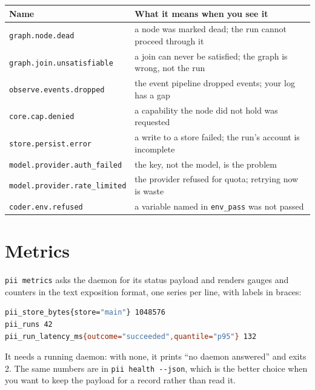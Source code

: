 \begin{center}\footnotesize
\begin{tabular}{@{}>{\raggedright\arraybackslash}p{}>{\raggedright\arraybackslash}p{}@{}}
  \toprule
  \textbf{Name} & \textbf{What it means when you see it} \\
  \midrule
  \texttt{graph.node.dead} & a node was marked dead; the run cannot proceed through it \\
  \texttt{graph.join.unsatisfiable} & a join can never be satisfied; the graph is wrong, not
    the run \\
  \texttt{observe.events.dropped} & the event pipeline dropped events; your log has a gap \\
  \texttt{core.cap.denied} & a capability the node did not hold was requested \\
  \texttt{store.persist.error} & a write to a store failed; the run's account is incomplete \\
  \texttt{model.provider.auth\_failed} & the key, not the model, is the problem \\
  \texttt{model.provider.rate\_limited} & the provider refused for quota; retrying now is waste \\
  \texttt{coder.env.refused} & a variable named in \texttt{env\_pass} was not passed \\
  \bottomrule
\end{tabular}
\end{center}

\section{Metrics}

\texttt{pii metrics} asks the daemon for its status payload and renders gauges and counters in
the text exposition format, one series per line, with labels in braces:

\begin{lstlisting}[language=bash]
pii_store_bytes{store="main"} 1048576
pii_runs 42
pii_run_latency_ms{outcome="succeeded",quantile="p95"} 132
\end{lstlisting}

It needs a running daemon: with none, it prints \enquote{no daemon answered} and exits 2. The
same numbers are in \texttt{pii health -{}-json}, which is the better choice when you want to
keep the payload for a record rather than read it.

